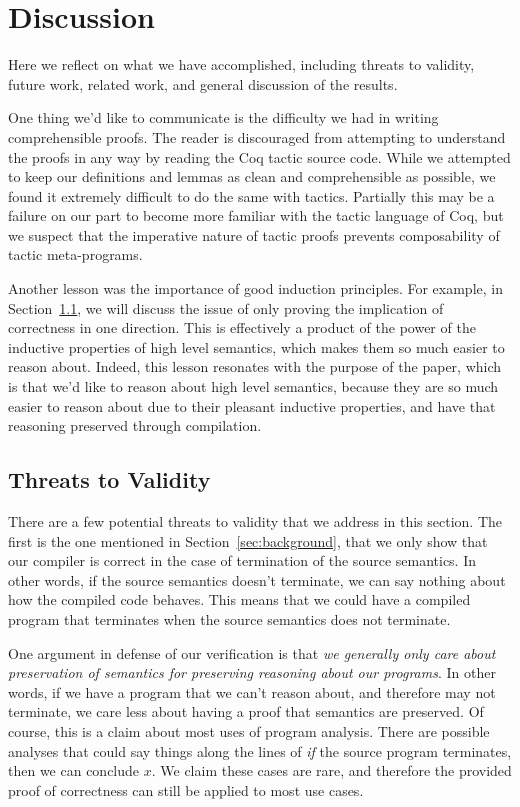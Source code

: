 \section{Discussion} \label{sec:discussion}

Here we reflect on what we have accomplished, including threats to validity,
future work, related work, and general discussion of the results.

One thing we'd like to communicate is the difficulty we had in writing
comprehensible proofs. The reader is discouraged from attempting to understand
the proofs in any way by reading the Coq tactic source code. While we attempted
to keep our definitions and lemmas as clean and comprehensible as possible, we
found it extremely difficult to do the same with tactics. Partially this may be
a failure on our part to become more familiar with the tactic language of Coq,
but we suspect that the imperative nature of tactic proofs prevents
composability of tactic meta-programs. 

Another lesson was the importance of good induction principles. For example, in
Section~\ref{sec:threats}, we will discuss the issue of only proving the
implication of correctness in one direction. This is effectively a product of
the power of the inductive properties of high level semantics, which makes them
so much easier to reason about. Indeed, this lesson resonates with the purpose
of the paper, which is that we'd like to reason about high level semantics,
because they are so much easier to reason about due to their pleasant inductive
properties, and have that reasoning preserved through compilation. 

\subsection{Threats to Validity} \label{sec:threats}

There are a few potential threats to validity that we address in this section. The
first is the one mentioned in Section~\ref{sec:background}, that we only show
that our compiler is correct in the case of termination of the source semantics.
In other words, if the source semantics doesn't terminate, we can say nothing
about how the compiled code behaves. This means that we could have a compiled
program that terminates when the source semantics does not terminate.

One argument in defense of our verification is that \emph{we generally only care
about preservation of semantics for preserving reasoning about our programs}. In
other words, if we have a program that we can't reason about, and therefore may
not terminate, we care less about having a proof that semantics are preserved.
Of course, this is a claim about most uses of program analysis. There are
possible analyses that could say things along the lines of \emph{if} the source
program terminates, then we can conclude $x$. We claim these cases are rare, and
therefore the provided proof of correctness can still be applied to most use
cases.  

